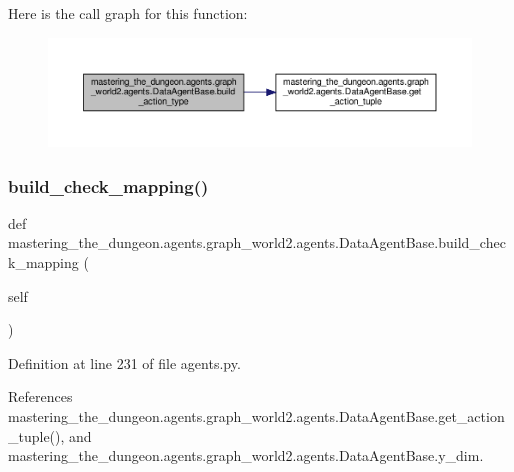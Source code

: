 Here is the call graph for this function\+:
\nopagebreak
\begin{figure}[H]
\begin{center}
\leavevmode
\includegraphics[width=350pt]{classmastering__the__dungeon_1_1agents_1_1graph__world2_1_1agents_1_1DataAgentBase_a45e963a17f2639a29f35f66e858bcb86_cgraph}
\end{center}
\end{figure}
\mbox{\label{classmastering__the__dungeon_1_1agents_1_1graph__world2_1_1agents_1_1DataAgentBase_a67cb2755dc42ed432cec7e6b7efa2f98}} 
\subsubsection{\texorpdfstring{build\+\_\+check\+\_\+mapping()}{build\_check\_mapping()}}
{\footnotesize\ttfamily def mastering\+\_\+the\+\_\+dungeon.\+agents.\+graph\+\_\+world2.\+agents.\+Data\+Agent\+Base.\+build\+\_\+check\+\_\+mapping (\begin{DoxyParamCaption}\item[{}]{self }\end{DoxyParamCaption})}



Definition at line 231 of file agents.\+py.



References mastering\+\_\+the\+\_\+dungeon.\+agents.\+graph\+\_\+world2.\+agents.\+Data\+Agent\+Base.\+get\+\_\+action\+\_\+tuple(), and mastering\+\_\+the\+\_\+dungeon.\+agents.\+graph\+\_\+world2.\+agents.\+Data\+Agent\+Base.\+y\+\_\+dim.

